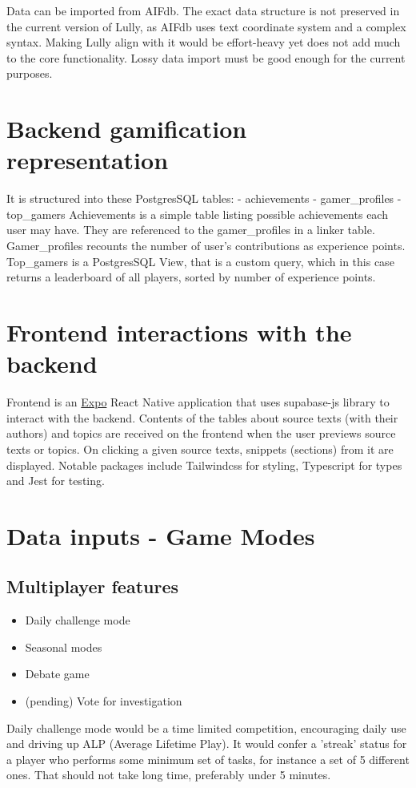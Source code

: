 \documentclass{article}
\begin{document}
Data can be imported from AIFdb. The exact data structure is not preserved in the current version of Lully, as AIFdb uses text coordinate system and a complex syntax. Making Lully align with it would be effort-heavy yet does not add much to the core functionality. Lossy data import must be good enough for the current purposes.

\section{Backend gamification representation}

It is structured into these PostgresSQL tables:
- achievements
- gamer_profiles 
- top_gamers 
Achievements is a simple table listing possible achievements each user may have. They are referenced to the gamer_profiles in a linker table. Gamer_profiles recounts the number of user's contributions as experience points.
Top_gamers is a PostgresSQL View, that is a custom query, which in this case returns a leaderboard of all players, sorted by number of experience points.

\section{Frontend interactions with the backend}

Frontend is an \href{https://expo.dev/}{Expo} React Native application that uses supabase-js library to interact with the backend.
Contents of the tables about source texts (with their authors) and topics are received on the frontend when the user previews source texts or topics. On clicking a given source texts, snippets (sections) from it are displayed.
Notable packages include Tailwindcss for styling, Typescript for types and Jest for testing. 

\section{Data inputs - Game Modes}
\subsection{Multiplayer features}
\begin{itemize}
  \item Daily challenge mode
  \item Seasonal modes
  \item Debate game
  \item (pending) Vote for investigation
\end{itemize}
Daily challenge mode would be a time limited competition, encouraging daily use and driving up ALP (Average Lifetime Play). It would confer a 'streak' status for a player who performs some minimum set of tasks, for instance a set of 5 different ones. That should not take long time, preferably under 5 minutes.
\end{document}
